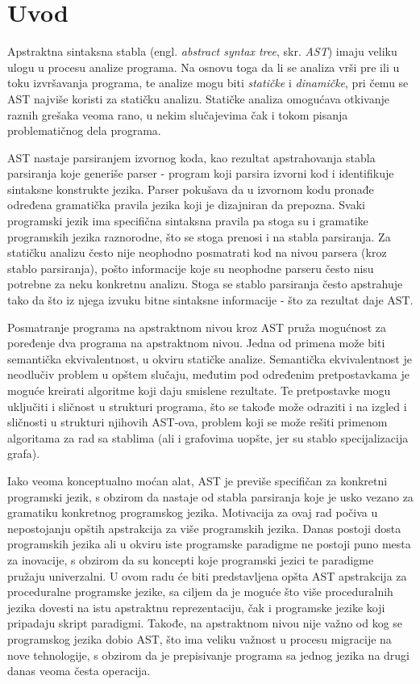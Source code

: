 \chapter{Uvod}
\label{chp:Intro}

Apstraktna sintaksna stabla (engl. \emph{abstract syntax tree}, skr. \emph{AST}) imaju veliku ulogu u procesu analize programa. Na osnovu toga da li se analiza vrši pre ili u toku izvršavanja programa, te analize mogu biti \emph{statičke} i \emph{dinamičke}, pri čemu se AST najviše koristi za statičku analizu. Statičke analiza omogućava otkivanje raznih grešaka veoma rano, u nekim slučajevima čak i tokom pisanja problematičnog dela programa. 

AST nastaje parsiranjem izvornog koda, kao rezultat apstrahovanja stabla parsiranja koje generiše parser - program koji parsira izvorni kod i identifikuje sintaksne konstrukte jezika. Parser pokušava da u izvornom kodu pronađe određena gramatička pravila jezika koji je dizajniran da prepozna. Svaki programski jezik ima specifična sintaksna pravila pa stoga su i gramatike programskih jezika raznorodne, što se stoga prenosi i na stabla parsiranja. Za statičku analizu često nije neophodno posmatrati kod na nivou parsera (kroz stablo parsiranja), pošto informacije koje su neophodne parseru često nisu potrebne za neku konkretnu analizu. Stoga se stablo parsiranja često apstrahuje tako da što iz njega izvuku bitne sintaksne informacije - što za rezultat daje AST.

Posmatranje programa na apstraktnom nivou kroz AST pruža mogućnost za poređenje dva programa na apstraktnom nivou. Jedna od primena može biti semantička ekvivalentnost, u okviru statičke analize. Semantička ekvivalentnost je neodlučiv problem u opštem slučaju, međutim pod određenim pretpostavkama je moguće kreirati algoritme koji daju smislene rezultate. Te pretpostavke mogu uključiti i sličnost u strukturi programa, što se takođe može odraziti i na izgled i sličnosti u strukturi njihovih AST-ova, problem koji se može rešiti primenom algoritama za rad sa stablima (ali i grafovima uopšte, jer su stablo specijalizacija grafa). 

Iako veoma konceptualno moćan alat, AST je previše specifičan za konkretni programski jezik, s obzirom da nastaje od stabla parsiranja koje je usko vezano za gramatiku konkretnog programskog jezika. Motivacija za ovaj rad počiva u nepostojanju opštih apstrakcija za više programskih jezika. Danas postoji dosta programskih jezika ali u okviru iste programske paradigme ne postoji puno mesta za inovacije, s obzirom da su koncepti koje programski jezici te paradigme pružaju univerzalni. U ovom radu će biti predstavljena opšta AST apstrakcija za proceduralne programske jezike, sa ciljem da je moguće što više proceduralnih jezika dovesti na istu apstraktnu reprezentaciju, čak i programske jezike koji pripadaju skript paradigmi. Takođe, na apstraktnom nivou nije važno od kog se programskog jezika dobio AST, što ima veliku važnost u procesu migracije na nove tehnologije, s obzirom da je prepisivanje programa sa jednog jezika na drugi danas veoma česta operacija.

